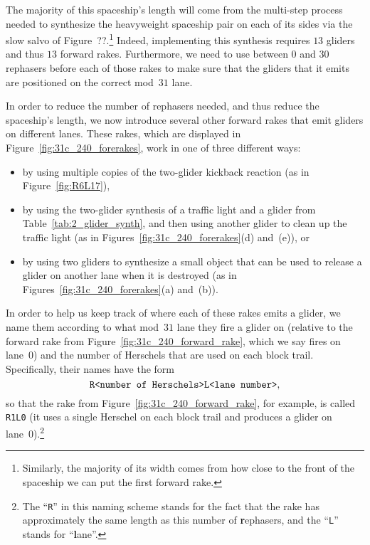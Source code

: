 The majority of this spaceship's length will come from the multi-step process needed to synthesize the heavyweight spaceship pair on each of its sides via the slow salvo of Figure~??.\footnote{Similarly, the majority of its width comes from how close to the front of the spaceship we can put the first forward rake.} Indeed, implementing this synthesis requires $13$ gliders and thus $13$ forward rakes. Furthermore, we need to use between $0$ and $30$ rephasers before each of those rakes to make sure that the gliders that it emits are positioned on the correct mod~$31$ lane.

In order to reduce the number of rephasers needed, and thus reduce the spaceship's length, we now introduce several other forward rakes that emit gliders on different lanes. These rakes, which are displayed in Figure~\ref{fig:31c_240_forerakes}, work in one of three different ways:\smallskip

\begin{itemize}
	\item by using multiple copies of the two-glider kickback reaction (as in Figure~\ref{fig:R6L17}),\smallskip
	
	\item by using the two-glider synthesis of a traffic light and a glider from Table~\ref{tab:2_glider_synth}, and then using another glider to clean up the traffic light (as in Figures~\ref{fig:31c_240_forerakes}(d) and~(e)), or\smallskip
	
	\item by using two gliders to synthesize a small object that can be used to release a glider on another lane when it is destroyed (as in Figures~\ref{fig:31c_240_forerakes}(a) and~(b)).\smallskip
\end{itemize}

In order to help us keep track of where each of these rakes emits a glider, we name them according to what mod~$31$ lane they fire a glider on (relative to the forward rake from Figure~\ref{fig:31c_240_forward_rake}, which we say fires on lane~$0$) and the number of Herschels that are used on each block trail. Specifically, their names have the form
\[
	\text{\texttt{R<number of Herschels>L<lane number>}},
\]
so that the rake from Figure~\ref{fig:31c_240_forward_rake}, for example, is called \texttt{R1L0} (it uses a single Herschel on each block trail and produces a glider on lane~0).\footnote{The ``\texttt{R}'' in this naming scheme stands for the fact that the rake has approximately the same length as this number of \textbf{r}ephasers, and the ``\texttt{L}'' stands for ``\textbf{l}ane''.}


